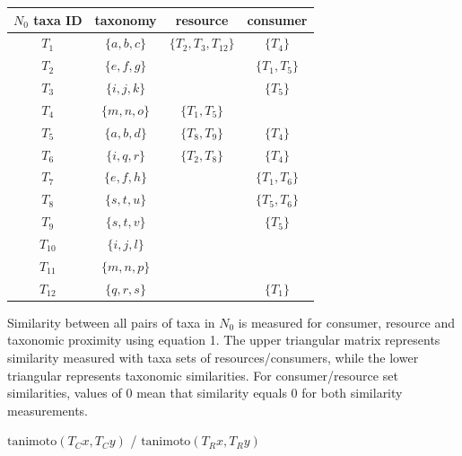     \begin{table}[h!]
      \centering
      \begin{tabular}{cccc}
        \hline
        $N_0$ taxa ID & taxonomy &          resource &             consumer        \\
        \hline
        \hline
        $T_1$ &         $\{a, b, c\}$ &     $\{T_2, T_3, T_{12}\}$ &    $\{T_4\}$         \\
        $T_2$ &         $\{e, f, g\}$ &      &                          $\{T_1, T_5\}$    \\
        $T_3$ &         $\{i, j, k\}$ &      &                          $\{T_5\}$         \\
        $T_4$ &         $\{m, n, o\}$ &     $\{T_1, T_5\}$ &                              \\
        $T_5$ &         $\{a, b, d\}$ &     $\{T_8, T_9\}$ &            $\{T_4\}$         \\
        $T_6$ &         $\{i, q, r\}$ &     $\{T_2, T_8\}$ &            $\{T_4\}$         \\
        $T_7$ &         $\{e, f, h\}$ &      &                          $\{T_1, T_6\}$    \\
        $T_8$ &         $\{s, t, u\}$ &      &                          $\{T_5, T_6\}$    \\
        $T_9$ &         $\{s, t, v\}$ &      &                          $\{T_5\}$         \\
        $T_{10}$ &      $\{i, j, l\}$ &      &                                            \\
        $T_{11}$ &      $\{m, n, p\}$ &      &                                            \\
        $T_{12}$ &      $\{q, r, s\}$ &      &                          $\{T_1\}$         \\
        \hline
      \end{tabular}
    \end{table}

Similarity between all pairs of taxa in $N_0$ is measured for consumer, resource and taxonomic proximity using equation 1. The upper triangular matrix represents similarity measured with taxa sets of resources/consumers, while the lower triangular represents taxonomic similarities. For consumer/resource set similarities, values of 0 mean that similarity equals 0 for both similarity measurements.
\bigskip

    \centerline{$\mbox{tanimoto}(T_Cx, T_Cy)$ / $\mbox{tanimoto}(T_Rx, T_Ry)$ }

